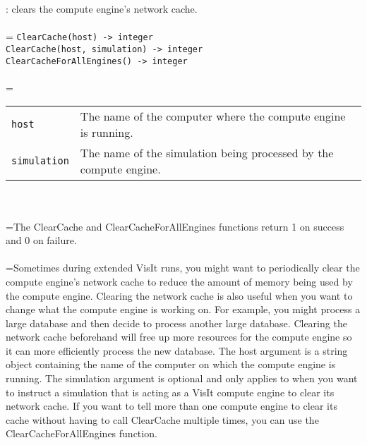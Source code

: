 \documentclass[10pt,a4paper]{report}
\begin{document}
{}
: clears the compute engine's network cache.\\[-3mm]

 \\ 
\hangindent=\parindent 
\verb!ClearCache(host) -> integer!\\ 
\verb!ClearCache(host, simulation) -> integer!\\ 
\verb!ClearCacheForAllEngines() -> integer!\\ [-3mm]

 \\ 
\hangindent=\parindent 
\begin{tabular}{lp{9cm}}
\verb!host! & The name of the computer where the compute engine is running. \\
\verb!simulation! & The name of the simulation being processed by the compute engine. \\
\end{tabular} \\[-2mm]


 \\ 
\hangindent=\parindent The ClearCache and ClearCacheForAllEngines functions return 1 on success and 0 on failure. \\[-3mm] 

 \\ 
\hangindent=\parindent Sometimes during extended VisIt runs, you might want to periodically clear the compute engine's network cache to reduce the amount of memory being used by the compute engine. Clearing the network cache is also useful when you want to change what the compute engine is working on. For example, you might process a large database and then decide to process another large database. Clearing the network cache beforehand will free up more resources for the compute engine so it can more efficiently process the new database. The host argument is a string object containing the name of the computer on which the compute engine is running. The simulation argument is optional and only applies to when you want to instruct a simulation that is acting as a VisIt compute engine to clear its network cache. If you want to tell more than one compute engine to clear its cache without having to call ClearCache multiple times, you can use the ClearCacheForAllEngines function. \\[-3mm] 
\end{document}
